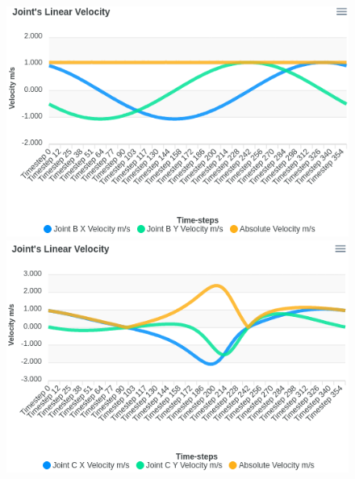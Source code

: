 \documentclass[12pt]{article}
\begin{document}
\begin{figure}[ht]
  \includegraphics[scale=0.45]{../pmks-plots/linJointVel/linJointVelB.png}%
  \includegraphics[scale=0.45]{../pmks-plots/linJointVel/linJointVelC.png}


\end{figure}
\end{document}
